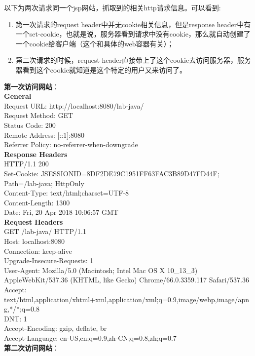 以下为两次请求同一个jsp网站，抓取到的相关http请求信息。可以看到:
\begin{enumerate}
\item
第一次请求的request header中并无cookie相关信息，但是response header中有一个set-cookie，也就是说，服务器看到请求中没有cookie，那么就自动创建了一个cookie给客户端（这个和具体的web容器有关）；
\item
第二次请求的时候，request header直接带上了这个cookie去访问服务器，服务器看到这个cookie就知道是这个特定的用户又来访问了。
\end{enumerate}
\textbf{第一次访问网站}：\\
\textbf{General}\\
Request URL: http://localhost:8080/lab-java/\\
Request Method: GET\\
Status Code: 200 \\
Remote Address: [::1]:8080\\
Referrer Policy: no-referrer-when-downgrade\\
\textbf{Response Headers}\\
HTTP/1.1 200\\
Set-Cookie: JSESSIONID=8DF2DE79C1951FF63FAC3B89D47FD44F; Path=/lab-java; HttpOnly\\
Content-Type: text/html;charset=UTF-8\\
Content-Length: 1300\\
Date: Fri, 20 Apr 2018 10:06:57 GMT\\
\textbf{Request Headers}\\
GET /lab-java/ HTTP/1.1\\
Host: localhost:8080\\
Connection: keep-alive\\
Upgrade-Insecure-Requests: 1\\
User-Agent: Mozilla/5.0 (Macintosh; Intel Mac OS X 10\_13\_3) AppleWebKit/537.36 (KHTML, like Gecko) Chrome/66.0.3359.117 Safari/537.36\\
Accept: text/html,application/xhtml+xml,application/xml;q=0.9,image/webp,image/apng,*/*;q=0.8\\
DNT: 1\\
Accept-Encoding: gzip, deflate, br\\
Accept-Language: en-US,en;q=0.9,zh-CN;q=0.8,zh;q=0.7\\
\textbf{第二次访问网站}：\\
